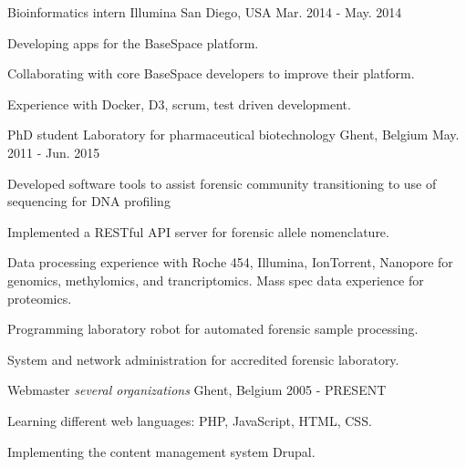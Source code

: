 \begin{cventries}
  \cventry
    {Bioinformatics intern} %
    {Illumina} %
    {San Diego, USA} %
    {Mar. 2014 - May. 2014} %
    {
      \begin{cvitems} %
        \item {Developing apps for the BaseSpace platform.}
        \item {Collaborating with core BaseSpace developers to improve
            their platform.}
        \item {Experience with Docker, D3, scrum, test driven development.}
      \end{cvitems}
    }

  \cventry
    {PhD student } %
    {Laboratory for pharmaceutical biotechnology} %
    {Ghent, Belgium} %
    {May. 2011 - Jun. 2015} %
    {
      \begin{cvitems} %
        \item {Developed software tools to assist forensic community
            transitioning to use of sequencing for DNA profiling}
        \item {Implemented a RESTful API server for forensic allele
            nomenclature.}
        \item {Data processing experience with Roche 454, Illumina,
            IonTorrent, Nanopore for genomics, methylomics, and
            trancriptomics. Mass spec data experience for proteomics.}
        \item {Programming laboratory robot for automated forensic
            sample processing.}
        \item {System and network administration for accredited
            forensic laboratory.}
      \end{cvitems}
    }

  \cventry
    {Webmaster} %
    {\emph{several organizations}} %
    {Ghent, Belgium} %
    {2005 - PRESENT} %
    {
      \begin{cvitems} %
        \item {Learning different web languages: PHP, JavaScript, HTML, CSS.}
        \item {Implementing the content management system Drupal.}
      \end{cvitems}
    }

\end{cventries}
